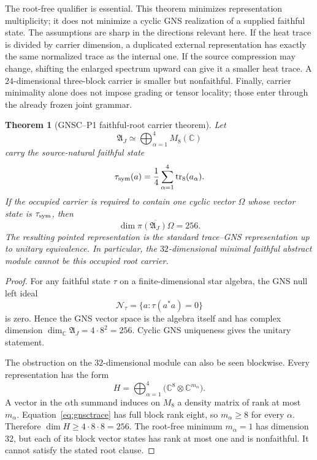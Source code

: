 \documentclass[11pt,a4paper]{article}
\newtheorem{theorem}[definition]{Theorem}
\theoremstyle{remark}
\begin{document}
The root-free qualifier is essential.  This theorem minimizes representation
multiplicity; it does not minimize a cyclic GNS realization of a supplied
faithful state.  The assumptions are sharp in the directions relevant here.  If the heat
trace is divided by carrier dimension, a duplicated external representation
has exactly the same normalized trace as the internal one.  If the source
compression may change, shifting the enlarged spectrum upward can give it a
smaller heat trace.  A $24$-dimensional three-block carrier is smaller but
nonfaithful.  Finally, carrier minimality alone does not impose grading or
tensor locality; those enter through the already frozen joint grammar.

\begin{theorem}[GNSC--P1 faithful-root carrier theorem]
Let
\begin{equation}
 \mathfrak A_J\simeq\bigoplus_{\alpha=1}^{4}M_8(\mathbb C)
 \label{eq:gnscalgebra}
\end{equation}
carry the source-natural faithful state
\begin{equation}
 \tau_{\rm sym}(a)=\frac14\sum_{\alpha=1}^{4}
 \operatorname{tr}_8(a_\alpha).
 \label{eq:gnsctrace}
\end{equation}
If the occupied carrier is required to contain one cyclic vector $\Omega$
whose vector state is $\tau_{\rm sym}$, then
\begin{equation}
 \boxed{\dim\overline{\pi(\mathfrak A_J)\Omega}=256.}
 \label{eq:gnscdimension}
\end{equation}
The resulting pointed representation is the standard trace--GNS
representation up to unitary equivalence.  In particular, the
$32$-dimensional minimal faithful abstract module cannot be this occupied
root carrier.
\label{thm:gnsccarrier}
\end{theorem}

\begin{proof}
For any faithful state $\tau$ on a finite-dimensional star algebra, the GNS
null left ideal
\begin{equation}
 \mathcal N_\tau=\{a:\tau(a^*a)=0\}
 \label{eq:gnscnull}
\end{equation}
is zero.  Hence the GNS vector space is the algebra itself and has complex
dimension
$\dim_{\mathbb C}\mathfrak A_J=4\cdot8^2=256$.  Cyclic GNS uniqueness gives
the unitary statement.

The obstruction on the $32$-dimensional module can also be seen blockwise.
Every representation has the form
\begin{equation}
 H=\bigoplus_{\alpha=1}^{4}
 \bigl(\mathbb C^8\otimes\mathbb C^{m_\alpha}\bigr).
 \label{eq:gnscmultiplicity}
\end{equation}
A vector in the $\alpha$th summand induces on $M_8$ a density matrix of rank
at most $m_\alpha$.  Equation~\eqref{eq:gnsctrace} has full block rank eight,
so $m_\alpha\ge8$ for every $\alpha$.  Therefore
$\dim H\ge4\cdot8\cdot8=256$.  The root-free minimum
$m_\alpha=1$ has dimension $32$, but each of its block vector states has rank
at most one and is nonfaithful.  It cannot satisfy the stated root clause.
\end{proof}
\end{document}
